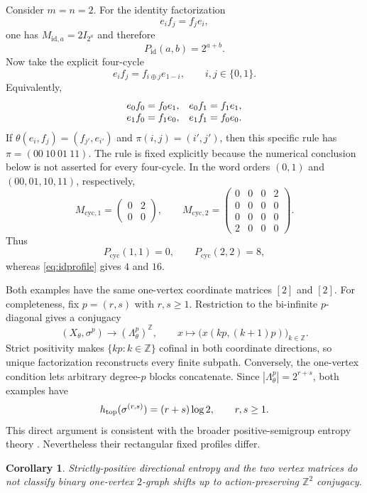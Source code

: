 \documentclass[11pt,a4paper]{amsart}
\newtheorem{corollary}[theorem]{Corollary}
\theoremstyle{definition}
\theoremstyle{remark}
\newcommand{\Z}{\mathbb Z}
\begin{document}
Consider $m=n=2$.  For the identity factorization
\[
 e_i f_j=f_j e_i,
\]
one has $M_{\mathrm{id},a}=2I_{2^a}$ and therefore
\begin{equation}\label{eq:idprofile}
 P_{\mathrm{id}}(a,b)=2^{a+b}.
\end{equation}
Now take the explicit four-cycle
\begin{equation}\label{eq:cycle}
 e_i f_j=f_{i\oplus j}e_{1-i},\qquad i,j\in\{0,1\}.
\end{equation}
Equivalently,
\[
\begin{array}{c@{\quad}c}
e_0f_0=f_0e_1,&e_0f_1=f_1e_1,\\
e_1f_0=f_1e_0,&e_1f_1=f_0e_0.
\end{array}
\]
If $\theta(e_i,f_j)=(f_{j'},e_{i'})$ and
$\pi(i,j)=(i',j')$, then this specific rule has
$\pi=(00\ 10\ 01\ 11)$.  The rule is fixed explicitly because the numerical
conclusion below is not asserted for every four-cycle.
In the word orders $(0,1)$ and $(00,01,10,11)$, respectively,
\[
 M_{\mathrm{cyc},1}=
 \begin{pmatrix}0&2\\0&0\end{pmatrix},
 \qquad
 M_{\mathrm{cyc},2}=
 \begin{pmatrix}
 0&0&0&2\\0&0&0&0\\0&0&0&0\\2&0&0&0
 \end{pmatrix}.
\]
Thus
\[
 P_{\mathrm{cyc}}(1,1)=0,
 \qquad P_{\mathrm{cyc}}(2,2)=8,
\]
whereas \eqref{eq:idprofile} gives $4$ and $16$.

Both examples have the same one-vertex coordinate matrices $[2]$ and $[2]$.
For completeness, fix $p=(r,s)$ with $r,s\geq1$.  Restriction to the
bi-infinite $p$-diagonal gives a conjugacy
\[
 (X_\theta,\sigma^p)\longrightarrow
 (\Lambda_\theta^p)^\Z,
 \qquad
 x\longmapsto\bigl(x(kp,(k+1)p)\bigr)_{k\in\Z}.
\]
Strict positivity makes $\{kp:k\in\Z\}$ cofinal in both coordinate
directions, so unique factorization reconstructs every finite subpath.
Conversely, the one-vertex condition lets arbitrary degree-$p$ blocks
concatenate.  Since $|\Lambda_\theta^p|=2^{r+s}$, both examples have
\[
 h_{\rm top}(\sigma^{(r,s)})=(r+s)\log2,
 \qquad r,s\geq1.
\]
This direct argument is consistent with the broader positive-semigroup
entropy theory \cite{SkalskiZacharias2008}.  Nevertheless their rectangular
fixed profiles differ.

\begin{corollary}
Strictly-positive directional entropy and the two vertex matrices do not classify
binary one-vertex $2$-graph shifts up to action-preserving $\Z^2$ conjugacy.
\end{corollary}
\end{document}
